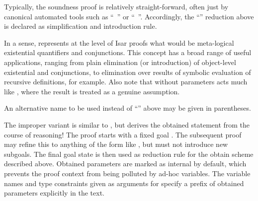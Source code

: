 \begin{isabellebody}
\begin{isamarkuptext}
  Typically, the soundness proof is relatively straight-forward, often
  just by canonical automated tools such as ``\hyperlink{command.by}{\mbox{}}~'' or ``\hyperlink{command.by}{\mbox{}}~''.  Accordingly, the
  ``'' reduction above is declared as simplification and
  introduction rule.

  In a sense, \hyperlink{command.obtain}{\mbox{}} represents at the level of Isar
  proofs what would be meta-logical existential quantifiers and
  conjunctions.  This concept has a broad range of useful
  applications, ranging from plain elimination (or introduction) of
  object-level existential and conjunctions, to elimination over
  results of symbolic evaluation of recursive definitions, for
  example.  Also note that \hyperlink{command.obtain}{\mbox{}} without parameters acts
  much like \hyperlink{command.have}{\mbox{}}, where the result is treated as a
  genuine assumption.

  An alternative name to be used instead of ``'' above may
  be given in parentheses.

  \medskip The improper variant \hyperlink{command.guess}{\mbox{}} is similar to
  \hyperlink{command.obtain}{\mbox{}}, but derives the obtained statement from the
  course of reasoning!  The proof starts with a fixed goal .  The subsequent proof may refine this to anything of the
  form like , but must not introduce new subgoals.  The
  final goal state is then used as reduction rule for the obtain
  scheme described above.  Obtained parameters  are marked as internal by default, which prevents the
  proof context from being polluted by ad-hoc variables.  The variable
  names and type constraints given as arguments for \hyperlink{command.guess}{\mbox{}}
  specify a prefix of obtained parameters explicitly in the text.


\end{isamarkuptext}
\end{isabellebody}
